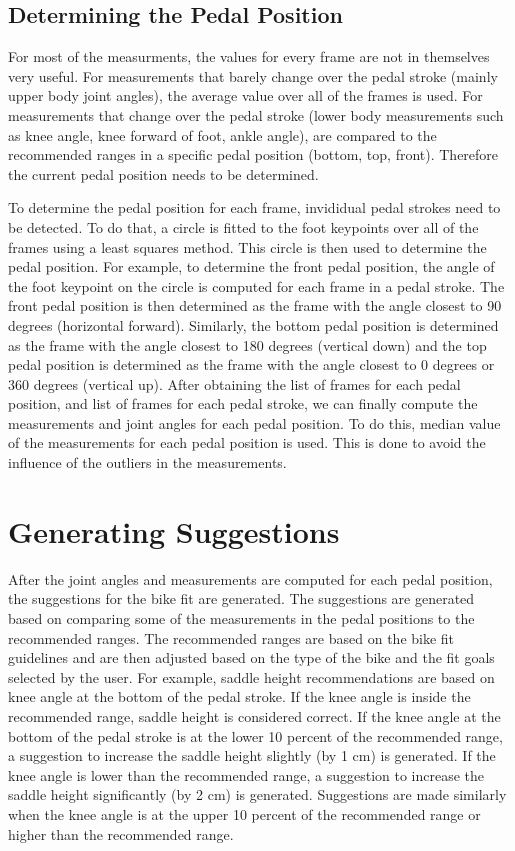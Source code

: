 \subsection{Determining the Pedal Position}

For most of the measurments, the values for every frame are not in themselves very useful. For measurements that barely change over the pedal stroke (mainly upper body joint angles), the average value over all of the frames is used. For measurements that change over the pedal stroke (lower body measurements such as knee angle, knee forward of foot, ankle angle), are compared to the recommended ranges in a specific pedal position (bottom, top, front). Therefore the current pedal position needs to be determined.

To determine the pedal position for each frame, invididual pedal strokes need to be detected. To do that, a circle is fitted to the foot keypoints over all of the frames using a least squares method. This circle is then used to determine the pedal position. For example, to determine the front pedal position, the angle of the foot keypoint on the circle is computed for each frame in a pedal stroke. The front pedal position is then determined as the frame with the angle closest to 90 degrees (horizontal forward). Similarly, the bottom pedal position is determined as the frame with the angle closest to 180 degrees (vertical down) and the top pedal position is determined as the frame with the angle closest to 0 degrees or 360 degrees (vertical up). After obtaining the list of frames for each pedal position, and list of frames for each pedal stroke, we can finally compute the measurements and joint angles for each pedal position. To do this, median value of the measurements for each pedal position is used. This is done to avoid the influence of the outliers in the measurements.


\section{Generating Suggestions}
\label{generating_suggestions}
After the joint angles and measurements are computed for each pedal position, the suggestions for the bike fit are generated. The suggestions are generated based on comparing some of the measurements in the pedal positions to the recommended ranges. The recommended ranges are based on the bike fit guidelines and are then adjusted based on the type of the bike and the fit goals selected by the user. For example, saddle height recommendations are based on knee angle at the bottom of the pedal stroke. If the knee angle is inside the recommended range, saddle height is considered correct. If the knee angle at the bottom of the pedal stroke is at the lower 10 percent of the recommended range, a suggestion to increase the saddle height slightly (by 1 cm) is generated. If the knee angle is lower than the recommended range, a suggestion to increase the saddle height significantly (by 2 cm) is generated. Suggestions are made similarly when the knee angle is at the upper 10 percent of the recommended range or higher than the recommended range.

